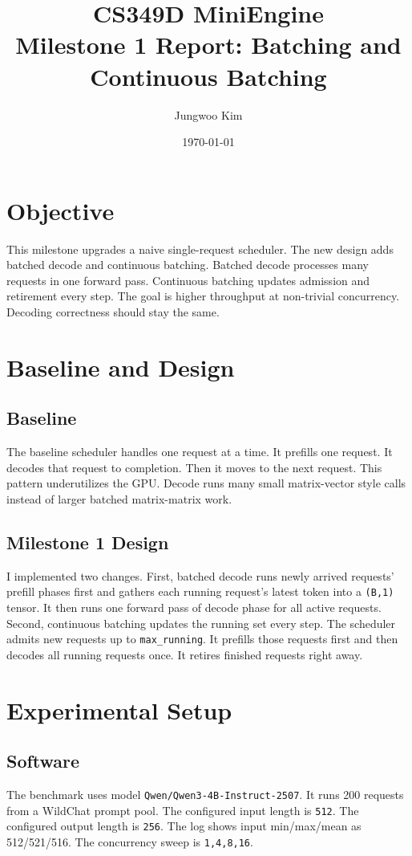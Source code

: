 \documentclass[11pt]{article}
\title{CS349D MiniEngine\\Milestone 1 Report: Batching and Continuous Batching}
\author{Jungwoo Kim}
\date{\today}
\begin{document}
\maketitle

\section{Objective}
This milestone upgrades a naive single-request scheduler. The new design adds batched decode and continuous batching. Batched decode processes many requests in one forward pass. Continuous batching updates admission and retirement every step. The goal is higher throughput at non-trivial concurrency. Decoding correctness should stay the same.

\section{Baseline and Design}
\subsection{Baseline}
The baseline scheduler handles one request at a time. It prefills one request. It decodes that request to completion. Then it moves to the next request. This pattern underutilizes the GPU. Decode runs many small matrix-vector style calls instead of larger batched matrix-matrix work.

\subsection{Milestone 1 Design}
I implemented two changes. First, batched decode runs newly arrived requests' prefill phases first and gathers each running request's latest token into a \texttt{(B,1)} tensor. It then runs one forward pass of decode phase for all active requests. Second, continuous batching updates the running set every step. The scheduler admits new requests up to \texttt{max\_running}. It prefills those requests first and then decodes all running requests once. It retires finished requests right away.

\section{Experimental Setup}
\subsection{Software}
The benchmark uses model \texttt{Qwen/Qwen3-4B-Instruct-2507}. It runs 200 requests from a WildChat prompt pool. The configured input length is \texttt{512}. The configured output length is \texttt{256}. The log shows input min/max/mean as 512/521/516. The concurrency sweep is \texttt{1,4,8,16}.
\end{document}
